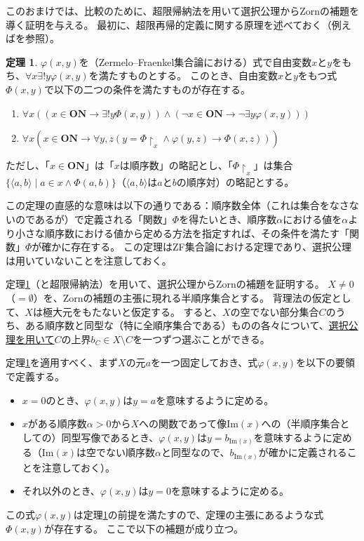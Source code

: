 ﻿\documentclass{ltjsarticle}
\theoremstyle{definition}
\newtheorem{theorem}{定理}
\begin{document}
このおまけでは、比較のために、超限帰納法を用いて選択公理からZornの補題を導く証明を与える。
最初に、超限再帰的定義に関する原理を述べておく（例えば\cite[第I章定理9.3]{Kunen}を参照）。

\begin{theorem}
    \label{thm:transfinite_induction}
    $\varphi(x,y)$を（Zermelo--Fraenkel集合論における）式で自由変数$x$と$y$をもち、$\forall x \exists! y \varphi(x,y)$を満たすものとする。
    このとき、自由変数$x$と$y$をもつ式$\Phi(x,y)$で以下の二つの条件を満たすものが存在する。
    \begin{enumerate}
        \item $\forall x ( (x \in \mathbf{ON} \to \exists! y \Phi(x,y)) \land (\neg x \in \mathbf{ON} \to \neg\exists y \varphi(x,y) ) )$
        \item $\forall x ( x \in \mathbf{ON} \to \forall y,z ( y = \Phi\!\upharpoonright_x \land \varphi(y,z) \to \Phi(x,z) ) )$
    \end{enumerate}
    ただし、「$x \in \mathbf{ON}$」は「$x$は順序数」の略記とし、「$\Phi\!\upharpoonright_x$」は集合$\{\langle a,b \rangle \mid a \in x \land \Phi(a,b)\}$（$\langle a,b \rangle$は$a$と$b$の順序対）の略記とする。
\end{theorem}

この定理の直感的な意味は以下の通りである：順序数全体（これは集合をなさないのであるが）で定義される「関数」$\Phi$を得たいとき、順序数$\alpha$における値を$\alpha$より小さな順序数における値から定める方法を指定すれば、その条件を満たす「関数」$\Phi$が確かに存在する。
この定理はZF集合論における定理であり、選択公理は用いていないことを注意しておく。

定理\ref{thm:transfinite_induction}（と超限帰納法）を用いて、選択公理からZornの補題を証明する。
$X \neq 0$（$= \emptyset$）を、Zornの補題の主張に現れる半順序集合とする。
背理法の仮定として、$X$は極大元をもたないと仮定する。
すると、$X$の空でない部分集合$C$のうち、ある順序数と同型な（特に全順序集合である）ものの各々について、\underline{選択公理を用いて}$C$の上界$b_C \in X \setminus C$を一つずつ選ぶことができる。

定理\ref{thm:transfinite_induction}を適用すべく、まず$X$の元$a$を一つ固定しておき、式$\varphi(x,y)$を以下の要領で定義する。
\begin{itemize}
    \item $x = 0$のとき、$\varphi(x,y)$は$y = a$を意味するように定める。
    \item $x$がある順序数$\alpha > 0$から$X$への関数であって像$\mathrm{Im}(x)$への（半順序集合としての）同型写像であるとき、$\varphi(x,y)$は$y = b_{\mathrm{Im}(x)}$を意味するように定める（$\mathrm{Im}(x)$は空でない順序数$\alpha$と同型なので、$b_{\mathrm{Im}(x)}$が確かに定義されることを注意しておく）。
    \item それ以外のとき、$\varphi(x,y)$は$y = 0$を意味するように定める。
\end{itemize}
この式$\varphi(x,y)$は定理\ref{thm:transfinite_induction}の前提を満たすので、定理の主張にあるような式$\Phi(x,y)$が存在する。
ここで以下の補題が成り立つ。
\end{document}
